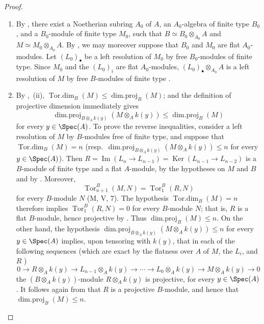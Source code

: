 \begin{proof}
\begin{enumerate}[label=(\roman*)]
  \item By , there exist a Noetherian subring $A_0$ of $A$, an $A_0$-algebra of finite type $B_0$, and a $B_0$-module of finite type $M_0$, such that $B\simeq B_0\otimes_{A_0}A$ and $M\simeq M_0\otimes_{A_0}A$.
  By , we may moreover suppose that $B_0$ and $M_0$ are flat $A_0$-modules.
  Let $(L_0)_\bullet$ be a left resolution of $M_0$ by free $B_0$-modules of finite type.
  Since $M_0$ and the $(L_0)_i$ are flat $A_0$-modules, $(L_0)_\bullet\otimes_{A_0}A$ is a left resolution of $M$ by free $B$-modules of finite type .

  \item By ,~(ii),
  $\operatorname{Tor.dim}_B(M)\leqslant\operatorname{dim.proj}_B(M)$; and the definition of projective dimension immediately gives
  \[
    \operatorname{dim.proj}_{B\otimes_A k(y)}(M\otimes_A k(y))
    \leqslant \operatorname{dim.proj}_B(M)
  \]
  for every $y\in\Spec(A)$.
  To prove the reverse inequalities, consider a left resolution of $M$ by $B$-modules free of finite type, and suppose that $\operatorname{Tor.dim}_B(M)=n$ (resp.\ $\operatorname{dim.proj}_{B\otimes_A k(y)}(M\otimes_A k(y))\leqslant n$ for every $y\in\Spec(A)$).
  Then
  $R=\operatorname{Im}(L_n\to L_{n-1})=\operatorname{Ker}(L_{n-1}\to L_{n-2})$
  is a $B$-module of finite type and a flat $A$-module, by the hypotheses on $M$ and $B$ and by .
  Moreover,
  \[
    \operatorname{Tor}_{n+1}^B(M,N)=\operatorname{Tor}_1^B(R,N)
  \]
  for every $B$-module $N$ (M, V, 7).
  The hypothesis $\operatorname{Tor.dim}_B(M)=n$ therefore implies $\operatorname{Tor}_1^B(R,N)=0$ for every $B$-module $N$; that is, $R$ is a flat $B$-module, hence projective by .
  Thus $\operatorname{dim.proj}_B(M)\leqslant n$.
  On the other hand, the hypothesis $\operatorname{dim.proj}_{B\otimes_A k(y)}(M\otimes_A k(y))\leqslant n$ for every $y\in\Spec(A)$ implies, upon tensoring with $k(y)$, that in each of the following sequences (which are exact by the flatness over $A$ of $M$, the $L_i$, and $R$ )
  \[
    0\to R\otimes_A k(y)\to L_{n-1}\otimes_A k(y)\to\cdots\to L_0\otimes_A k(y)\to M\otimes_A k(y)\to 0
  \]
  the $(B\otimes_A k(y))$-module $R\otimes_A k(y)$ is projective, for every $y\in\Spec(A)$.
  It follows again from  that $R$ is a projective $B$-module, and hence that $\operatorname{dim.proj}_B(M)\leqslant n$.
\end{enumerate}
\end{proof}

